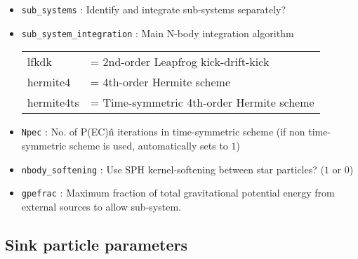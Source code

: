 \documentclass[a4paper]{article}
\newcommand{\var}[1]{\texttt{#1}}
\begin{document}
\begin{itemize}

\item \var{sub\_systems} : Identify and integrate sub-systems separately?

\item \var{sub\_system\_integration} : Main N-body integration algorithm \\
\begin{tabular}{ll}
lfkdk        & = 2nd-order Leapfrog kick-drift-kick \\
hermite4     & = 4th-order Hermite scheme \\
hermite4ts   & = Time-symmetric 4th-order Hermite scheme
\end{tabular}

\item \var{Npec} : No. of P(EC)\^n iterations in time-symmetric scheme (if non time-symmetric scheme is used, automatically sets to $1$)

\item \var{nbody\_softening} : Use SPH kernel-softening between star particles? ($1$ or $0$)

\item \var{gpefrac} : Maximum fraction of total gravitational potential energy from external sources to allow sub-system.

\end{itemize}





\subsection{Sink particle parameters}
\end{document}
